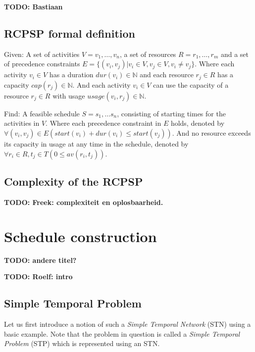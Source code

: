 \documentclass{article}
\theoremstyle{definition}
\newcommand{\TODO}[1]{{\color{red}\textbf{TODO: #1}}}
\newcommand{\av}[2]{\ensuremath{av(r_{#1}, t_{#2})}} %
\newcommand{\capa}[1]{\ensuremath{cap(r_{#1})}} %
\newcommand{\dur}[1]{\ensuremath{dur(v_{#1})}} %
\newcommand{\usage}[2]{\ensuremath{usage(v_{#1}, r_{#2})}} %
\newcommand{\start}[1]{\ensuremath{start(v_{#1})}} %
\newenvironment{definition}[1][Definition]{\begin{trivlist}
\item[\hskip \labelsep {\bfseries #1}]}{\end{trivlist}}
\begin{document}
\TODO{Bastiaan}


\subsection{RCPSP formal definition}

\begin{definition}
Given:
A set of activities $V = v_1, \ldots, v_n$, a set of resources $R = r_1, \ldots, r_m$ and a set of precedence constraints $E =  \{(v_i, v_j) | v_i \in V, v_j \in V, v_i \neq v_j\}$.
Where each activity $v_i \in V$ has a duration $\dur{i} \in \mathbb{N}$ and each resource $r_j \in R$ has a capacity $\capa{j} \in \mathbb{N}$. 
And each activity $v_i \in V$ can use the capacity of a resource $r_j \in R$ with usage $\usage{i}{j} \in \mathbb{N}$.

Find:
A feasible schedule $S = s_1, \ldots s_n$, consisting of starting times for the activities in $V$.
Where each precedence constraint in $E$ holds, denoted by $\forall (v_i, v_j) \in E (\start{i} + \dur{i} \leq \start{j})$.
And no resource exceeds its capacity in usage at any time in the schedule, denoted by $\forall r_i \in R, t_j \in T (0 \leq \av{i}{j})$.
\end{definition}


\subsection{Complexity of the RCPSP}
\TODO{Freek: complexiteit en oplosbaarheid.}


\newpage


\section{Schedule construction} \TODO{andere titel?}

\TODO{Roelf: intro}

\subsection{Simple Temporal Problem}
Let us first introduce a notion of such a \emph{Simple Temporal Network} (STN) using a basic example. 
Note that the problem in question is called a \emph{Simple Temporal Problem} (STP) which is represented using an STN.
\end{document}
